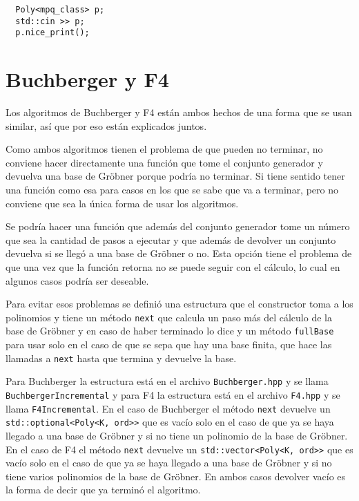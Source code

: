 \documentclass[12pt]{report}
\theoremstyle{customstyle}
\theoremstyle{factstyle}
\begin{document}
\begin{verbatim}
  Poly<mpq_class> p;
  std::cin >> p;
  p.nice_print();
\end{verbatim}

\section{Buchberger y F4}

Los algoritmos de Buchberger y F4 están ambos hechos de una forma que se usan similar, así que por eso están explicados juntos.

Como ambos algoritmos tienen el problema de que pueden no terminar, no conviene hacer directamente una función que tome el conjunto generador y devuelva una base de Gröbner porque podría no terminar. Si tiene sentido tener una función como esa para casos en los que se sabe que va a terminar, pero no conviene que sea la única forma de usar los algoritmos.

Se podría hacer una función que además del conjunto generador tome un número que sea la cantidad de pasos a ejecutar y que además de devolver un conjunto devuelva si se llegó a una base de Gröbner o no. Esta opción tiene el problema de que una vez que la función retorna no se puede seguir con el cálculo, lo cual en algunos casos podría ser deseable.

Para evitar esos problemas se definió una estructura que el constructor toma a los polinomios y tiene un método \texttt{next} que calcula un paso más del cálculo de la base de Gröbner y en caso de haber terminado lo dice y un método \texttt{fullBase} para usar solo en el caso de que se sepa que hay una base finita, que hace las llamadas a \texttt{next} hasta que termina y devuelve la base.

Para Buchberger la estructura está en el archivo \texttt{Buchberger.hpp} y se llama \texttt{BuchbergerIncremental} y para F4 la estructura está en el archivo \texttt{F4.hpp} y se llama \texttt{F4Incremental}. En el caso de Buchberger el método \texttt{next} devuelve un \texttt{std::optional<Poly<K, ord>>} que es vacío solo en el caso de que ya se haya llegado a una base de Gröbner y si no tiene un polinomio de la base de Gröbner. En el caso de F4 el método \texttt{next} devuelve un \texttt{std::vector<Poly<K, ord>>} que es vacío solo en el caso de que ya se haya llegado a una base de Gröbner y si no tiene varios polinomios de la base de Gröbner. En ambos casos devolver vacío es la forma de decir que ya terminó el algoritmo.
\end{document}
